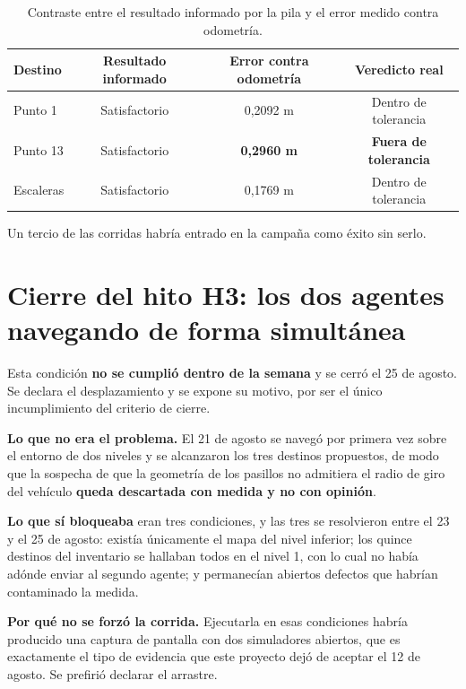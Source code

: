 \documentclass[12pt,letterpaper]{article}
\begin{document}
\begin{table}[H]
    \centering
    \small
    \caption{Contraste entre el resultado informado por la pila y el error medido contra odometría.}
    \label{tab:regla}
    \begin{tabular}{@{}lccc@{}}
        \toprule
        \textbf{Destino} & \textbf{Resultado informado} & \textbf{Error contra odometría} & \textbf{Veredicto real} \\ \midrule
        Punto 1  & Satisfactorio & 0,2092 m & Dentro de tolerancia \\
        Punto 13 & Satisfactorio & \textbf{0,2960 m} & \textbf{Fuera de tolerancia} \\
        Escaleras & Satisfactorio & 0,1769 m & Dentro de tolerancia \\ \bottomrule
    \end{tabular}
\end{table}

Un tercio de las corridas habría entrado en la campaña como éxito sin serlo.

\section{Cierre del hito H3: los dos agentes navegando de forma simultánea}
\label{sec:h3}

Esta condición \textbf{no se cumplió dentro de la semana} y se cerró el 25 de agosto. Se declara el desplazamiento y se expone su motivo, por ser el único incumplimiento del criterio de cierre.

\textbf{Lo que no era el problema.} El 21 de agosto se navegó por primera vez sobre el entorno de dos niveles y se alcanzaron los tres destinos propuestos, de modo que la sospecha de que la geometría de los pasillos no admitiera el radio de giro del vehículo \textbf{queda descartada con medida y no con opinión}.

\textbf{Lo que sí bloqueaba} eran tres condiciones, y las tres se resolvieron entre el 23 y el 25 de agosto: existía únicamente el mapa del nivel inferior; los quince destinos del inventario se hallaban todos en el nivel 1, con lo cual no había adónde enviar al segundo agente; y permanecían abiertos defectos que habrían contaminado la medida.

\textbf{Por qué no se forzó la corrida.} Ejecutarla en esas condiciones habría producido una captura de pantalla con dos simuladores abiertos, que es exactamente el tipo de evidencia que este proyecto dejó de aceptar el 12 de agosto. Se prefirió declarar el arrastre.
\end{document}
